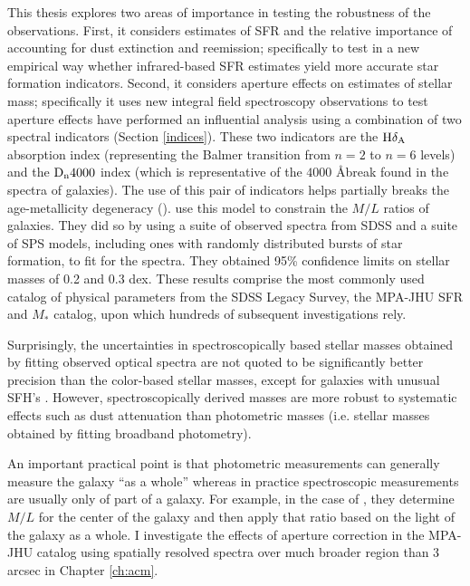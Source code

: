 This thesis explores two areas of importance in testing the robustness
of the observations. First, it considers estimates of SFR and the
relative importance of accounting for dust extinction and reemission;
specifically to test in a new empirical way whether infrared-based SFR
estimates yield more accurate star formation indicators.  Second, it
considers aperture effects on estimates of stellar mass; specifically
it uses new integral field spectroscopy observations to test aperture
effects 
\citet{kauffmann_stellar_2003} have performed
an influential analysis using a combination of two spectral indicators
(Section \ref{indices}). These two indicators are the ${\rm
  H}\delta_{\rm A}$ absorption index (representing the Balmer
transition from $n = 2$ to $n = 6$ levels) and the ${\rm D}_{\rm n}
4000$ index (which is representative of the $4000$ \AA break found in
the spectra of galaxies).  The use of this pair of indicators helps
partially breaks the age-metallicity degeneracy
(\citealt{worthey_comprehensive_1994}). \citet{kauffmann_stellar_2003}
use this model to constrain the $M/L$ ratios of galaxies. They did so
by using a suite of observed spectra from SDSS and a suite of SPS
models, including ones with randomly distributed bursts of star
formation, to fit for the spectra. They obtained 95\% confidence
limits on stellar masses of 0.2 and 0.3 dex.  These results comprise
the most commonly used catalog of physical parameters from the SDSS
Legacy Survey, the MPA-JHU SFR and $M_{*}$ catalog, upon which
hundreds of subsequent investigations rely.

Surprisingly, the uncertainties in spectroscopically based stellar
masses obtained by fitting observed optical spectra
\citep{kauffmann_stellar_2003, 2012MNRAS.421..314C} are not quoted to
be significantly better precision than the color-based stellar masses,
except for galaxies with unusual SFH's
\citet{2005MNRAS.362...41G}. However, spectroscopically derived masses
are more robust to systematic effects such as dust attenuation than
photometric masses (i.e. stellar masses obtained by fitting broadband
photometry).

An important practical point is that photometric measurements can
generally measure the galaxy ``as a whole'' whereas in practice
spectroscopic measurements are usually only of part of a galaxy. For
example, in the case of \citet{kauffmann_stellar_2003}, they determine
$M/L$ for the center of the galaxy and then apply that ratio based on
the light of the galaxy as a whole.  I investigate the effects of
aperture correction in the MPA-JHU catalog using spatially resolved
spectra over much broader region than 3 arcsec in Chapter
\ref{ch:acm}.\\

